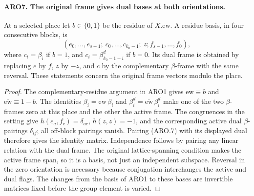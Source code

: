 \documentclass[11pt,a4paper]{article}
\numberwithin{equation}{section}
\theoremstyle{remark}\newtheorem{remark}[theorem]{Remark}
\begin{document}
\paragraph{ARO7. The original frame gives dual bases at both orientations.}
\label{claim:ARO7}
At a selected place let \(b\in\{0,1\}\) be the residue of
\(X.\mathrm{ew}\).  A residue basis, in four consecutive blocks,
is
\[
 (e_0,\ldots,e_{s-1};\ c_0,\ldots,c_{k_0-1};\ z;
                         f_{s-1},\ldots,f_0),        \tag{ARO.7}
\]
where \(c_i=\beta_i\) if \(b=1\), and
\(c_i=\beta^d_{k_0-1-i}\) if \(b=0\).
Its dual frame is obtained by replacing \(e\) by \(f\),
\(z\) by \(-z\), and \(c\) by the complementary \(\beta\)-frame
with the same reversal.  These statements concern the original
frame vectors modulo the place.
\begin{proof}
The complementary-residue argument in ARO1 gives
\(\mathrm{ew}\equiv b\) and \(\overline{\mathrm{ew}}\equiv1-b\).
The identities \(\beta_i=\mathrm{ew}\,\beta_i\) and
\(\beta_i^d=\overline{\mathrm{ew}}\,\beta_i^d\) make one of the
two \(\beta\)-frames zero at this place and the other the active
frame.  The congruences in the setting give
\(h(e_a,f_c)=\delta_{ac}\), \(h(z,z)=-1\), and the corresponding
active dual \(\beta\)-pairings \(\delta_{ij}\); all off-block
pairings vanish.  Pairing (ARO.7) with its displayed dual therefore
gives the identity matrix.  Independence follows by pairing any
linear relation with the dual frame.  The original lattice-spanning
condition makes the active frame span, so it is a basis, not just an
independent subspace.  Reversal in the zero orientation is necessary
because conjugation interchanges the active and dual flags.
The changes from the basis of ARO1 to these bases are invertible
matrices fixed before the group element is varied.
\end{proof}

\end{document}
